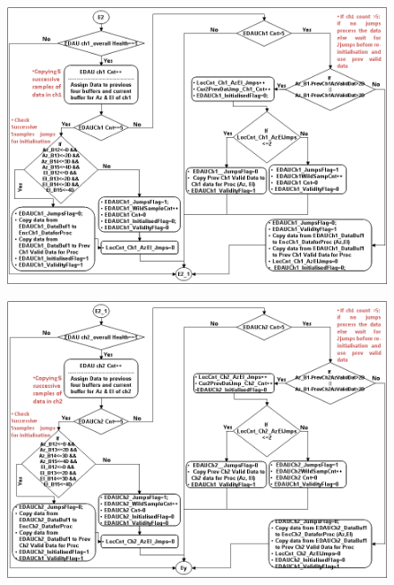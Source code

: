 \begin{figure}[H]
	\centering
	\includegraphics[width=\linewidth]{./FlowCharts/PngFlowCharts/EDAU2.png}
\end{figure}

\begin{figure}[H]
	\centering
	\includegraphics[width=\linewidth]{./FlowCharts/PngFlowCharts/EDAU3.png}
\end{figure}

